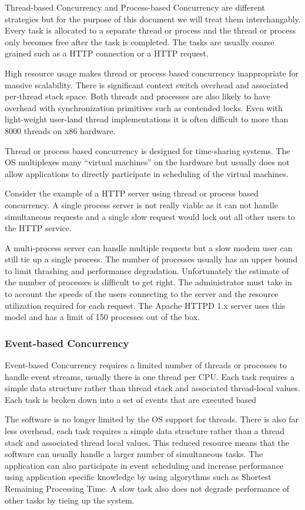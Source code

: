 \documentclass[a4paper]{article}
\begin{document}
Thread-based Concurrency and Process-based Concurrency are different strategies but for the purpose of this document we will treat them interchangably. Every task is allocated to a separate thread or process and the thread or process only becomes free after the task is completed. The tasks are usually coarse grained such as a HTTP connection or a HTTP request.

High resource usage makes thread or process based concurrency inappropriate for massive scalability. There is significant context switch overhead and associated per-thread stack space. Both threads and processes are also likely to have overhead with synchronization primitives such as contended locks. Even with light-weight user-land thread implementations it is often difficult to more than 8000 threads on x86 hardware.

Thread or process based concurrency is designed for time-sharing systems. The OS multiplexes many ``virtual machines'' on the hardware but usually does not allow applications to directly participate in scheduling of the virtual machines.

Consider the example of a HTTP server using thread or process based concurrency. A single process server is not really viable as it can not handle simultaneous requests and a single slow request would lock out all other users to the HTTP service.

A multi-process server can handle multiple requests but a slow modem user can still tie up a single process. The number of processes usually has an upper bound to limit thrashing and performance degradation. Unfortunately the estimate of the number of processes is difficult to get right. The administrator must take in to account the speeds of the users connecting to the server and the resource utilization required for each request. The Apache HTTPD 1.x server uses this model and has a limit of 150 processes out of the box.

\subsubsection{Event-based Concurrency}

Event-based Concurrency requires a limited number of threads or processes to handle event streams, usually there is one thread per CPU. Each task requires a simple data structure rather than thread stack and associated thread-local values. Each task is broken down into a set of events that are executed based 

The software is no longer limited by the OS support for threads. There is also far less overhead, each task requires a simple data structure rather than a thread stack and associated thread local values. This reduced resource means that the software can usually handle a larger number of simultaneous tasks. The application can also participate in event scheduling and increase performance using application specific knowledge by using algorythms such as Shortest Remaining Processing Time. A slow task also does not degrade performance of other tasks by tieing up the system.
\end{document}
